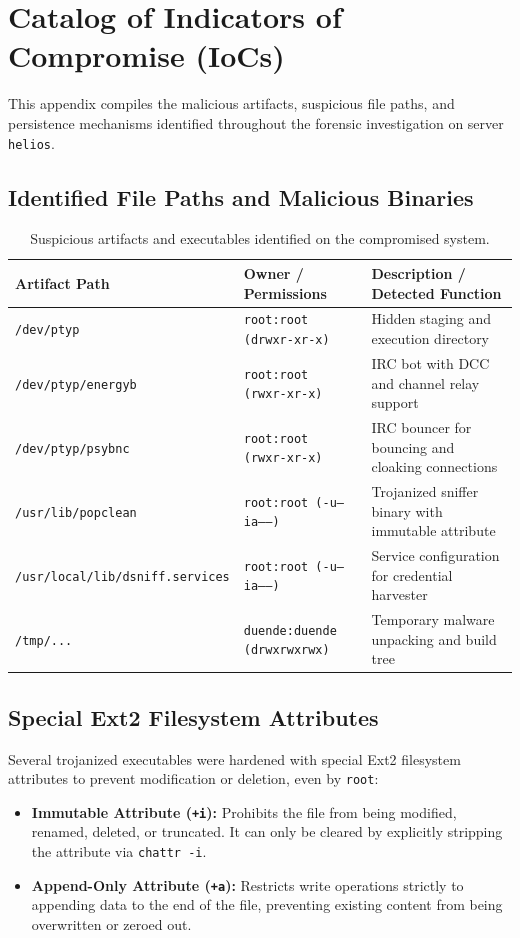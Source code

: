 \chapter{Catalog of Indicators of Compromise (IoCs)}

This appendix compiles the malicious artifacts, suspicious file paths, and persistence mechanisms identified throughout the forensic investigation on server \texttt{helios}.

\section{Identified File Paths and Malicious Binaries}

\begin{table}[h!]
\centering
\footnotesize
\begin{tabularx}{\textwidth}{@{} l l X @{}}
\toprule
\textbf{Artifact Path} & \textbf{Owner / Permissions} & \textbf{Description / Detected Function} \\
\midrule
\texttt{/dev/ptyp} & \texttt{root:root (drwxr-xr-x)} & Hidden staging and execution directory \\
\texttt{/dev/ptyp/energyb} & \texttt{root:root (rwxr-xr-x)} & IRC bot with DCC and channel relay support \\
\texttt{/dev/ptyp/psybnc} & \texttt{root:root (rwxr-xr-x)} & IRC bouncer for bouncing and cloaking connections \\
\texttt{/usr/lib/popclean} & \texttt{root:root (-u--ia-----)} & Trojanized sniffer binary with immutable attribute \\
\texttt{/usr/local/lib/dsniff.services} & \texttt{root:root (-u--ia-----)} & Service configuration for credential harvester \\
\texttt{/tmp/...} & \texttt{duende:duende (drwxrwxrwx)} & Temporary malware unpacking and build tree \\
\bottomrule
\end{tabularx}
\caption{Suspicious artifacts and executables identified on the compromised system.}
\end{table}

\section{Special Ext2 Filesystem Attributes}

Several trojanized executables were hardened with special Ext2 filesystem attributes to prevent modification or deletion, even by \texttt{root}:
\begin{itemize}
    \item \textbf{Immutable Attribute (\texttt{+i}):} Prohibits the file from being modified, renamed, deleted, or truncated. It can only be cleared by explicitly stripping the attribute via \texttt{chattr -i}.
    \item \textbf{Append-Only Attribute (\texttt{+a}):} Restricts write operations strictly to appending data to the end of the file, preventing existing content from being overwritten or zeroed out.
\end{itemize}
